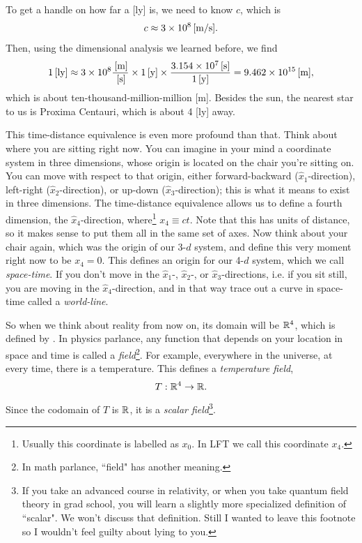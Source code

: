 To get a handle on how far a [ly] is, we need to know $c$, which is
\begin{equation}
c\approx3\times10^8\,[\text{m/s}].
\end{equation}
Then, using the dimensional analysis we learned before, we find
\begin{equation}
1\,[\text{ly}]
\approx3\times10^8\frac{\,[\text{m}]}{\,[\text{s}]}\times1\,[\text{y}]
\times\frac{3.154 \times 10^{7}\,[\text{s}]}{1\,[\text{y}]}
=9.462 \times 10^{15}\,[\text{m}],
\end{equation}
which is about ten-thousand-million-million [m]. Besides the sun, the nearest
star to us is Proxima Centauri, which is about 4 [ly] away.

This time-distance equivalence is even more profound than that. Think about
where you are sitting right now. You can imagine in your mind a coordinate
system in three dimensions, whose origin is located on the chair you're sitting
on. You can move with respect to that origin, either forward-backward
($\hat{x}_1$-direction), left-right ($\hat{x}_2$-direction), or up-down 
($\hat{x}_3$-direction); this is what it means to exist in three dimensions.
The time-distance equivalence allows us to define a fourth dimension,
the $\hat{x}_4$-direction, where\footnote{Usually this coordinate is labelled as
$x_0$. In LFT we call this coordinate $x_4$.} $x_4\equiv ct$. Note that this has units of
distance, so it makes sense to put them all in the same set of axes. Now think about
your chair again, which was the origin of our 3-$d$ system, and define this very
moment right now to be $x_4=0$. This defines an origin for our 4-$d$ system,
which we call {\it space-time}. If you don't move in the 
$\hat{x}_1$-, $\hat{x}_2$-, or $\hat{x}_3$-directions, i.e. if you sit still,
you are moving in the $\hat{x}_4$-direction, and in that way trace out a curve
in space-time called a {\it world-line}.

So when we think about reality from now on, its domain will be
$\mathbb{R}^4$, which is defined by .
In physics parlance, any function that depends on your location in space and
time is called a {\it field}\footnote{In math parlance, 
``field" has another meaning.}. For example, everywhere in the universe, at
every time, there is a temperature. This defines a {\it temperature field},
\begin{equation}
T:\mathbb{R}^4\to\mathbb{R}.
\end{equation}
Since the codomain of $T$ is $\mathbb{R}$, it is a {\it scalar field}\footnote{If you
take an advanced course in relativity, or when you take quantum field theory in
grad school, you will learn a slightly more specialized definition of ``scalar".
We won't discuss that definition. Still I wanted to leave this footnote so I
wouldn't feel guilty about lying to you.}.


